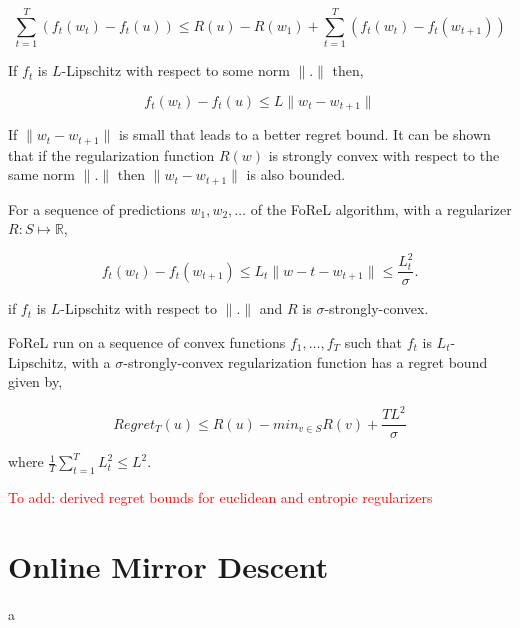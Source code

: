 $$\sum_{t=1}^T (f_t(w_t) - f_t(u)) \leq R(u) - R(w_1) + \sum_{t=1}^T (f_t(w_t) - f_t(w_{t+1}))$$

If $f_t$ is $L$-Lipschitz with respect to some norm $\|.\|$ then,

$$f_t(w_t) - f_t(u) \leq L \| w_t - w_{t+1} \|$$

If $\| w_t - w_{t+1} \|$ is small that leads to a better regret bound. It can be shown that if the regularization function $R(w)$ is strongly convex with 
respect to the same norm $\|.\|$ then $\|w_t - w_{t+1}\|$ is also bounded.

For a sequence of predictions $w_1, w_2, \ldots$ of the FoReL algorithm, with a regularizer $R: S \mapsto \mathbb{R}$,

$$f_t(w_t) - f_t(w_{t+1}) \leq L_t \|w-t - w_{t+1} \| \leq \frac{L_t^2}{\sigma}.$$

if $f_t$ is $L$-Lipschitz with respect to $\|.\|$ and $R$ is $\sigma$-strongly-convex.

\begin{theorem}\label{thm:forelregret}
    FoReL run on a sequence of convex functions $f_1, \ldots, f_T$ such that $f_t$ is $L_t$-Lipschitz, with a $\sigma$-strongly-convex regularization function 
    has a regret bound given by, 

    $$Regret_T(u) \leq R(u) - min_{v \in S} R(v) + \frac{TL^2}{\sigma}$$

    where $\frac{1}{T} \sum_{t=1}^T L_t^2 \leq L^2$.
\end{theorem}

\textcolor{red}{To add: derived regret bounds for euclidean and entropic regularizers}

\section{Online Mirror Descent}
a


% 

\begin{comment}
Mirror Descent:

Mirror descent with entropy regularization

Mirror descent with KL Divergence regularizations 


Mirror Descent Policy optimization (MDPO)

The update rule for on-policy MDPO is given by,

$\theta_{k+1} \leftarrow argmax_{\theta \in \Theta \psi(\theta, \theta_k)}$

$\psi(\theta, \theta_k) = \mathds{E}_{s ~ \rho_{\theta_k}}[\mathds{E}_{a~\pi_{\theta}}[A^{\theta_k}(S, a)] - \frac{1}{t_k} \textrm{KL}(s; \pi_{\theta}, \pi_{\theta_k})]$

\end{comment}

%